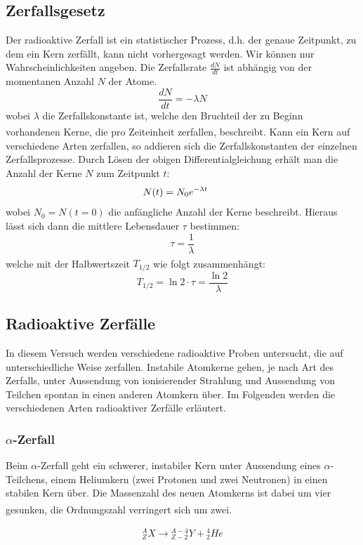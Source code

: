 \documentclass[12pt,listof=totoc]{scrartcl}
\begin{document}
\subsection{Zerfallsgesetz\label{zerfallsgesetz}}
Der radioaktive Zerfall ist ein statistischer Prozess, d.h. der genaue Zeitpunkt, zu dem ein Kern zerfällt, kann nicht vorhergesagt werden. Wir können nur Wahrscheinlichkeiten angeben. Die Zerfallsrate $\frac{dN}{dt}$ ist abhängig von der momentanen Anzahl $N$ der Atome.
\[\frac{dN}{dt}=-\lambda N\]
wobei $\lambda$ die Zerfallskonstante ist, welche den Bruchteil der zu Beginn vorhandenen Kerne, die pro Zeiteinheit zerfallen, beschreibt\textsuperscript{\cite{Demtröder}}. Kann ein Kern auf verschiedene Arten zerfallen, so addieren sich die Zerfallskonstanten der einzelnen Zerfallsprozesse. Durch Lösen der obigen Differentialgleichung erhält man die Anzahl der Kerne $N$ zum Zeitpunkt $t$:
\[N(t)=N_0e^{-\lambda t}\hspace{0.5cm}\]
wobei $N_0=N(t=0)$ die anfängliche Anzahl der Kerne beschreibt. Hieraus lässt sich dann die mittlere Lebensdauer $\tau$ bestimmen:
\[\tau=\frac{1}{\lambda}\]
welche mit der Halbwertszeit $T_{1/2}$ wie folgt zusammenhängt:\textsuperscript{\cite{Demtröder}}
\[T_{1/2} = \ln2\cdot \tau = \frac{\ln2}{\lambda}\]
 


\subsection{Radioaktive Zerfälle}
In diesem Versuch werden verschiedene radioaktive Proben untersucht, die auf unterschiedliche Weise zerfallen.
Instabile Atomkerne gehen, je nach Art des Zerfalls, unter Aussendung von ionisierender Strahlung und Aussendung von Teilchen spontan in einen anderen Atomkern über. Im Folgenden werden die verschiedenen Arten radioaktiver Zerfälle erläutert.
\subsubsection{$\alpha$-Zerfall}
Beim $\alpha$-Zerfall geht ein schwerer, instabiler Kern unter Aussendung eines $\alpha$-Teilchens, einem Heliumkern (zwei Protonen und zwei Neutronen) in einen stabilen Kern über. Die Massenzahl des neuen Atomkerns ist dabei um vier gesunken, die Ordnungszahl verringert sich um zwei.\textsuperscript{\cite{Demtröder}}

\begin{align}
{}_Z^A X \rightarrow {}_{Z-2}^{A-4} Y + {}^4_2He
\end{align}
\end{document}
